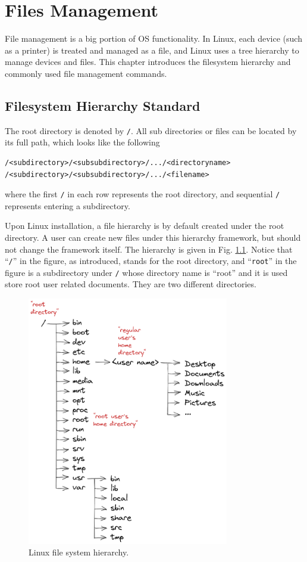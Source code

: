 \chapter{Files Management}

File management is a big portion of OS functionality. In Linux, each device (such as a printer) is treated and managed as a file, and Linux uses a tree hierarchy to manage devices and files. This chapter introduces the filesystem hierarchy and commonly used file management commands.

\section{Filesystem Hierarchy Standard} \label{ch4sec:hierarchy}

The root directory is denoted by \verb|/|. All sub directories or files can be located by its full path, which looks like the following
\begin{lstlisting}
/<subdirectory>/<subsubdirectory>/.../<directoryname>
/<subdirectory>/<subsubdirectory>/.../<filename>
\end{lstlisting}
where the first \verb|/| in each row represents the root directory, and sequential \verb|/| represents entering a subdirectory.

Upon Linux installation, a file hierarchy is by default created under the root directory. A user can create new files under this hierarchy framework, but should not change the framework itself. The hierarchy is given in Fig. \ref{ch4fig:hierarchy}. Notice that ``\verb|/|'' in the figure, as introduced, stands for the root directory, and ``\verb|root|'' in the figure is a subdirectory under \verb|/| whose directory name is ``root'' and it is used store root user related documents. They are two different directories.

\begin{figure}
	\centering
	\includegraphics[width=250pt]{chapters/chapter4/figures/linux_file_hierarchy.png}
	\caption{Linux file system hierarchy.} \label{ch4fig:hierarchy}
\end{figure}

